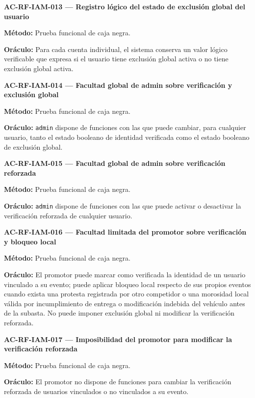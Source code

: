 \documentclass[10pt,letterpaper]{article}
\begin{document}
\noindent\textbf{AC-RF-IAM-013 --- Registro lógico del estado de exclusión global del usuario}\par
\textbf{Método:} Prueba funcional de caja negra.\par
\textbf{Oráculo:} Para cada cuenta individual, el sistema conserva un valor lógico verificable que expresa si el usuario tiene exclusión global activa o no tiene exclusión global activa.\par\vspace{0.45em}
\noindent\textbf{AC-RF-IAM-014 --- Facultad global de admin sobre verificación y exclusión global}\par
\textbf{Método:} Prueba funcional de caja negra.\par
\textbf{Oráculo:} \texttt{admin} dispone de funciones con las que puede cambiar, para cualquier usuario, tanto el estado booleano de identidad verificada como el estado booleano de exclusión global.\par\vspace{0.45em}
\noindent\textbf{AC-RF-IAM-015 --- Facultad global de admin sobre verificación reforzada}\par
\textbf{Método:} Prueba funcional de caja negra.\par
\textbf{Oráculo:} \texttt{admin} dispone de funciones con las que puede activar o desactivar la verificación reforzada de cualquier usuario.\par\vspace{0.45em}
\noindent\textbf{AC-RF-IAM-016 --- Facultad limitada del promotor sobre verificación y bloqueo local}\par
\textbf{Método:} Prueba funcional de caja negra.\par
\textbf{Oráculo:} El promotor puede marcar como verificada la identidad de un usuario vinculado a su evento; puede aplicar bloqueo local respecto de sus propios eventos cuando exista una protesta registrada por otro competidor o una morosidad local válida por incumplimiento de entrega o modificación indebida del vehículo antes de la subasta. No puede imponer exclusión global ni modificar la verificación reforzada.\par\vspace{0.45em}
\noindent\textbf{AC-RF-IAM-017 --- Imposibilidad del promotor para modificar la verificación reforzada}\par
\textbf{Método:} Prueba funcional de caja negra.\par
\textbf{Oráculo:} El promotor no dispone de funciones para cambiar la verificación reforzada de usuarios vinculados o no vinculados a su evento.\par\vspace{0.45em}
\end{document}

